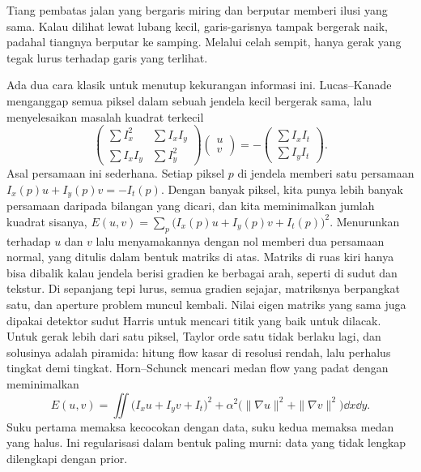 Tiang pembatas jalan yang bergaris miring dan berputar memberi ilusi yang sama. Kalau dilihat
lewat lubang kecil, garis-garisnya tampak bergerak naik, padahal tiangnya berputar ke samping.
Melalui celah sempit, hanya gerak yang tegak lurus terhadap garis yang terlihat.

Ada dua cara klasik untuk menutup kekurangan informasi ini. Lucas--Kanade menganggap semua piksel
dalam sebuah jendela kecil bergerak sama, lalu menyelesaikan masalah kuadrat terkecil
\begin{equation}
\begin{pmatrix}\sum I_x^2&\sum I_xI_y\\\sum I_xI_y&\sum I_y^2\end{pmatrix}
\begin{pmatrix}u\\v\end{pmatrix}=-\begin{pmatrix}\sum I_xI_t\\\sum I_yI_t\end{pmatrix}.
\end{equation}
Asal persamaan ini sederhana. Setiap piksel $p$ di jendela memberi satu persamaan
$I_x(p)u+I_y(p)v=-I_t(p)$. Dengan banyak piksel, kita punya lebih banyak persamaan daripada bilangan
yang dicari, dan kita meminimalkan jumlah kuadrat sisanya,
$E(u,v)=\sum_p\big(I_x(p)u+I_y(p)v+I_t(p)\big)^2$. Menurunkan terhadap $u$ dan $v$ lalu menyamakannya
dengan nol memberi dua persamaan normal, yang ditulis dalam bentuk matriks di atas. Matriks di ruas
kiri hanya bisa dibalik kalau jendela berisi gradien ke berbagai arah, seperti di sudut dan tekstur.
Di sepanjang tepi lurus, semua gradien sejajar, matriksnya berpangkat satu, dan aperture problem muncul
kembali. Nilai eigen matriks yang sama juga dipakai detektor sudut Harris untuk mencari titik yang baik
untuk dilacak. Untuk gerak lebih dari satu piksel, Taylor orde satu tidak berlaku lagi, dan
solusinya adalah piramida: hitung flow kasar di resolusi rendah, lalu perhalus tingkat demi
tingkat. Horn--Schunck \citep{horn1981} mencari medan flow yang padat dengan meminimalkan
\begin{equation}
E(u,v)=\iint\big(I_xu+I_yv+I_t\big)^2+\alpha^2\big(\|\nabla u\|^2+\|\nabla v\|^2\big)\dd x\dd y.
\label{eq:hornschunck}
\end{equation}
Suku pertama memaksa kecocokan dengan data, suku kedua memaksa medan yang halus. Ini regularisasi
dalam bentuk paling murni: data yang tidak lengkap dilengkapi dengan prior.

